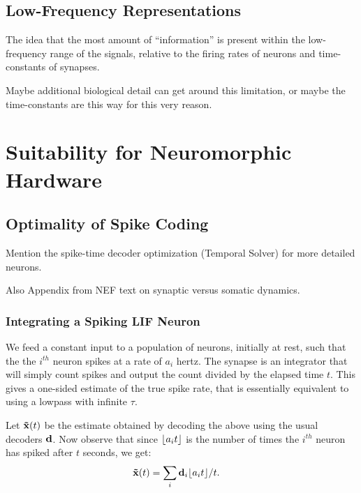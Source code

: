 \subsection{Low-Frequency Representations}

The idea that the most amount of ``information'' is present within the low-frequency range of the signals, relative to the firing rates of neurons and time-constants of synapses.

Maybe additional biological detail can get around this limitation, or maybe the time-constants are this way for this very reason.


\section{Suitability for Neuromorphic Hardware}

\citep{boahen2017neuromorph}

\subsection{Optimality of Spike Coding}
\label{sec:spike-coding}

Mention the spike-time decoder optimization (Temporal Solver) for more detailed neurons.

Also Appendix from NEF text on synaptic versus somatic dynamics.

\subsubsection{Integrating a Spiking LIF Neuron}

We feed a constant input to a population of neurons, initially at rest, such that the the $i^{th}$ neuron spikes at a rate of $a_i$ hertz. The synapse is an integrator that will simply count spikes and output the count divided by the elapsed time $t$. This gives a one-sided estimate of the true spike rate, that is essentially equivalent to using a lowpass with infinite $\tau$.

Let $\mathbf{\tilde{x}}(t)$ be the estimate obtained by decoding the above using the usual decoders $\mathbf{d}$. Now observe that since $\lfloor {a_i t} \rfloor$ is the number of times the $i^{th}$ neuron has spiked after $t$ seconds, we get:
\begin{align*}
\mathbf{\tilde{x}}(t) &= \sum_i \mathbf{d}_i \lfloor {a_i t} \rfloor / t .
\end{align*}

